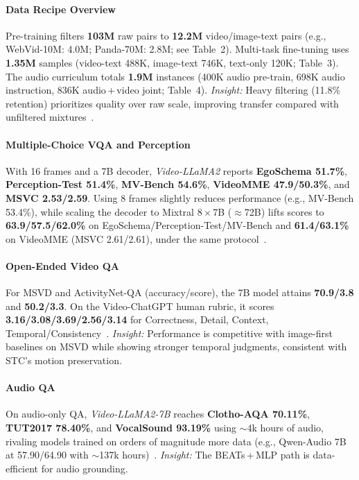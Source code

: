 \begin{enrichment}
\begin{enrichment}
        \paragraph{Data Recipe Overview}
        Pre\mbox{-}training filters \textbf{103M} raw pairs to \textbf{12.2M} video/image\mbox{-}text pairs (e.g., WebVid\mbox{-}10M: 4.0M; Panda\mbox{-}70M: 2.8M; see Table~2). Multi\mbox{-}task fine\mbox{-}tuning uses \textbf{1.35M} samples (video\mbox{-}text 488K, image\mbox{-}text 746K, text\mbox{-}only 120K; Table~3). The audio curriculum totals \textbf{1.9M} instances (400K audio pre\mbox{-}train, 698K audio instruction, 836K audio\,+\,video joint; Table~4). \textit{Insight:} Heavy filtering (11.8\% retention) prioritizes quality over raw scale, improving transfer compared with unfiltered mixtures~\cite[Tab.~2--4]{cheng2024_videollama2}.
        
        \paragraph{Multiple\mbox{-}Choice VQA and Perception}
        With 16 frames and a 7B decoder, \emph{Video\mbox{-}LLaMA2} reports \textbf{EgoSchema 51.7\%}, \textbf{Perception\mbox{-}Test 51.4\%}, \textbf{MV\mbox{-}Bench 54.6\%}, \textbf{VideoMME 47.9/50.3\%}, and \textbf{MSVC 2.53/2.59}. Using 8 frames slightly reduces performance (e.g., MV\mbox{-}Bench 53.4\%), while scaling the decoder to Mixtral 8\,$\times$\,7B (\(\approx\)72B) lifts scores to \textbf{63.9/57.5/62.0\%} on EgoSchema/Perception\mbox{-}Test/MV\mbox{-}Bench and \textbf{61.4/63.1\%} on VideoMME (MSVC 2.61/2.61), under the same protocol~\cite[Tab.~5]{cheng2024_videollama2}.
        
        \paragraph{Open\mbox{-}Ended Video QA}
        For MSVD and ActivityNet\mbox{-}QA (accuracy/score), the 7B model attains \textbf{70.9/3.8} and \textbf{50.2/3.3}. On the Video\mbox{-}ChatGPT human rubric, it scores \textbf{3.16/3.08/3.69/2.56/3.14} for Correctness, Detail, Context, Temporal/Consistency~\cite[Tab.~6]{cheng2024_videollama2}. \textit{Insight:} Performance is competitive with image\mbox{-}first baselines on MSVD while showing stronger temporal judgments, consistent with STC’s motion preservation.
        
        \paragraph{Audio QA}
        On audio\mbox{-}only QA, \emph{Video\mbox{-}LLaMA2\mbox{-}7B} reaches \textbf{Clotho\mbox{-}AQA 70.11\%}, \textbf{TUT2017 78.40\%}, and \textbf{VocalSound 93.19\%} using \(\sim\)4k hours of audio, rivaling models trained on orders of magnitude more data (e.g., Qwen\mbox{-}Audio 7B at 57.90/64.90 with \(\sim\)137k hours)~\cite[Tab.~7]{cheng2024_videollama2}. \textit{Insight:} The BEATs\,+\,MLP path is data\mbox{-}efficient for audio grounding.
        

\end{enrichment}
\end{enrichment}
